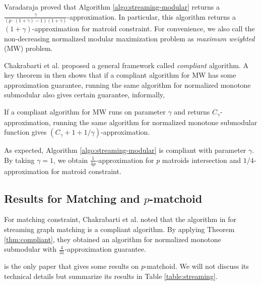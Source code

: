 Varadaraja proved that Algorithm \ref{algo:streaming-modular} returns a $\frac{\gamma}{(p\cdot (1 + \gamma) - 1)(1 + \gamma)}$-approximation. In particular, this algorithm returns a $(1 + \gamma)$-approximation for matroid constraint. For convenience, we also call the non-decreasing normalized modular maximization
problem as \emph{maximum weighted} (MW) problem. 

Chakrabarti et al. \cite{CK14} proposed a general framework called \emph{compliant} algorithm. A key theorem in \cite{CK14} then shows that if a compliant algorithm for MW has some approximation guarantee, running the same algorithm for normalized monotone submodular also gives certain guarantee, informally,
\begin{theorem}
  \label{thm:compliant}
  If a compliant algorithm for MW runs on parameter $\gamma$ and returns $C_{\gamma}$-approximation, running the same algorithm for normalized monotone submodular function gives $(C_{\gamma} + 1 + 1/\gamma)$-approximation.
\end{theorem}

As expected, Algorithm \ref{algo:streaming-modular} is compliant with parameter $\gamma$. By taking $\gamma = 1$, we obtain $\frac{1}{4p}$-approximation for $p$ matroids intersection and $1/4$-approximation for matroid constraint.










\subsection{Results for Matching and $p$-matchoid}
For matching constraint, Chakrabarti et al. \cite{CK14} noted that the algorithm in \cite{Z12} for streaming graph matching is a compliant algorithm. By applying Theorem \ref{thm:compliant}, they obtained an algorithm for normalized monotone submodular with $\frac{4}{31}$-approximation guarantee.

\cite{CGQ15} is the only paper that gives some results on $p$-matchoid. We will not discuss its technical details but summarize its results in Table \ref{table:streaming}.